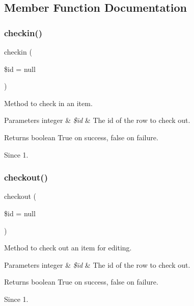 \subsection{Member Function Documentation}
\mbox{\label{classtks__agenda_model_item_scrap_form_aed5730af2828b3d6971569156f6cdacc}} 
\subsubsection{checkin()}
{\footnotesize\ttfamily checkin (\begin{DoxyParamCaption}\item[{}]{\$id = {\ttfamily null} }\end{DoxyParamCaption})}

Method to check in an item.


\begin{DoxyParams}[1]{Parameters}
integer & {\em \$id} & The id of the row to check out.\\
\hline
\end{DoxyParams}
\begin{DoxyReturn}{Returns}
boolean True on success, false on failure.
\end{DoxyReturn}
\begin{DoxySince}{Since}
1. 
\end{DoxySince}
\mbox{\label{classtks__agenda_model_item_scrap_form_a1194b08214f96a9c55ec99f461664883}} 
\subsubsection{checkout()}
{\footnotesize\ttfamily checkout (\begin{DoxyParamCaption}\item[{}]{\$id = {\ttfamily null} }\end{DoxyParamCaption})}

Method to check out an item for editing.


\begin{DoxyParams}[1]{Parameters}
integer & {\em \$id} & The id of the row to check out.\\
\hline
\end{DoxyParams}
\begin{DoxyReturn}{Returns}
boolean True on success, false on failure.
\end{DoxyReturn}
\begin{DoxySince}{Since}
1. 
\end{DoxySince}
\mbox{\label{classtks__agenda_model_item_scrap_form_a38046fc08ea7162796f2947adcd8ecc6}} 
